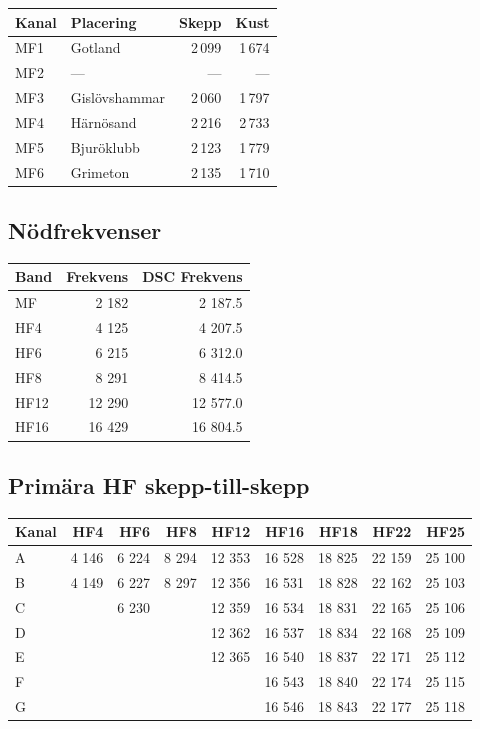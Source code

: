 {\begin{longtable}{llrr}
\textbf{Kanal} & \textbf{Placering} & \textbf{Skepp} & \textbf{Kust}  \\ \hline
\endhead

MF1 & Gotland       & 2\,099 & 1\,674 \\
MF2 & ---           & ---  & ---   \\
MF3 & Gislövshammar & 2\,060 & 1\,797  \\
MF4 & Härnösand     & 2\,216 & 2\,733  \\
MF5 & Bjuröklubb    & 2\,123 & 1\,779  \\
MF6 & Grimeton      & 2\,135 & 1\,710
\end{longtable}

\subsection{Nödfrekvenser}

\begin{longtable}{lrr}
\textbf{Band} & \textbf{Frekvens} & \textbf{DSC Frekvens}\\ \hline \endhead

MF   & 2 182  & 2 187.5  \\
HF4  & 4 125  & 4 207.5  \\
HF6  & 6 215  & 6 312.0  \\
HF8  & 8 291  & 8 414.5  \\
HF12 & 12 290 & 12 577.0 \\
HF16 & 16 429 & 16 804.5 \\
\end{longtable}

\subsection{Primära HF skepp-till-skepp}

\begin{longtable}{lrrrrrrrr}
\textbf{Kanal} & \textbf{HF4} & \textbf{HF6} & \textbf{HF8} &
               \textbf{HF12} & \textbf{HF16} & \textbf{HF18} &
               \textbf{HF22} & \textbf{HF25} \\
\hline
\endhead

A & 4 146 & 6 224 & 8 294 & 12 353 & 16 528 & 18 825 & 22 159 & 25 100 \\
B & 4 149 & 6 227 & 8 297 & 12 356 & 16 531 & 18 828 & 22 162 & 25 103 \\
C &       & 6 230 &       & 12 359 & 16 534 & 18 831 & 22 165 & 25 106 \\
D &       &       &       & 12 362 & 16 537 & 18 834 & 22 168 & 25 109 \\
E &       &       &       & 12 365 & 16 540 & 18 837 & 22 171 & 25 112 \\
F &       &       &       &        & 16 543 & 18 840 & 22 174 & 25 115 \\
G &       &       &       &        & 16 546 & 18 843 & 22 177 & 25 118 \\
\end{longtable}

}
